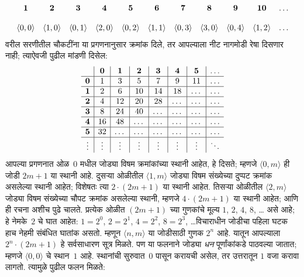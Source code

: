 \documentclass[11pt,a4paper,openany]{book}
\theoremstyle{definition}
\newenvironment{explain}{}{}
\newcommand{\tuple}[1]{\langle #1\rangle}
\begin{document}
\begin{explain}
\[
\begin{array}{@{}cc c c c c c c c c c@{}}
\mathbf 1 & \mathbf 2 & \mathbf 3 & \mathbf 4 & \mathbf 5 & \mathbf 6 & \mathbf 7 & \mathbf 8 & \mathbf 9 & \mathbf{10} & \dots \\ \\
\tuple{0,0} & \tuple{1,0} & \tuple{0,1} & \tuple{2,0}  & \tuple{0,2} &
\tuple{1,1} & \tuple{0,3} & \tuple{3,0}  & \tuple{0,4} &  \tuple{1,2} & \dots \\
\end{array}
\]
वरील सरणीतील चौकटींना या प्रगणनानुसार क्रमांक दिले, तर आपल्याला
नीट नागमोडी रेषा दिसणार नाही; त्याऐवजी पुढील मांडणी दिसेल:
\[
\begin{array}{ c | c | c | c | c | c | c | c }
& \mathbf 0 & \mathbf 1 & \mathbf 2 & \mathbf 3 & \mathbf 4 & \mathbf 5 & \dots \\
\hline
\mathbf 0 & 1 & 3 & 5 & 7 & 9 & 11 & \dots \\
\hline
\mathbf 1 & 2 & 6 & 10 & 14 & 18 & \dots & \dots \\
\hline
\mathbf 2 & 4 & 12 & 20 & 28 & \dots & \dots & \dots \\
\hline
\mathbf 3 & 8 & 24 & 40 & \dots & \dots & \dots & \dots \\
\hline
\mathbf 4 & 16 & 48 & \dots & \dots & \dots & \dots & \dots \\
\hline
\mathbf 5 & 32 & \dots & \dots & \dots & \dots & \dots & \dots \\
\hline
\vdots & \vdots & \vdots & \vdots & \vdots & \vdots & \vdots & \ddots\\
\end{array}
\]
आपल्या प्रगणनात ओळ~$0$ मधील जोड्या विषम क्रमांकांच्या स्थानी आहेत,
हे दिसते; म्हणजे $\tuple{0,m}$ ही जोडी $2m+1$ या स्थानी आहे. दुसऱ्या
ओळीतील $\tuple{1,m}$ जोड्या विषम संख्येच्या दुप्पट क्रमांक असलेल्या
स्थानी आहेत; विशेषतः त्या $2 \cdot (2m+1)$ या स्थानी आहेत. तिसऱ्या
ओळीतील $\tuple{2,m}$ जोड्या विषम संख्येच्या चौपट क्रमांक असलेल्या
स्थानी, म्हणजे $4 \cdot (2m+1)$ या स्थानी आहेत; आणि ही रचना अशीच
पुढे चालते. प्रत्येक ओळीत $(2m+1)$ च्या गुणकांचे मूल्य $1$, $2$,
$4$, $8$, \dots{} असे आहे; हे नेमके~$2$ चे घात आहेत:
$1= 2^0$, $2 = 2^1$, $4 = 2^2$, $8 = 2^3$, \dots\@ विचाराधीन
जोडीचा पहिला घटक हाच नेहमी संबंधित घातांक असतो. म्हणून
$\tuple{n,m}$ या जोडीसाठी गुणक $2^n$ आहे. यातून आपल्याला
$2^n \cdot (2m+1)$ हे सर्वसाधारण सूत्र मिळते. पण या फलनाने जोड्या
\emph{धन} पूर्णांकांकडे पाठवल्या जातात; म्हणजे $\tuple{0,0}$ चे
स्थान~$1$ आहे. स्थानांची सुरुवात~$0$ पासून करायची असेल, तर उत्तरातून
$1$ वजा करावा लागतो. त्यामुळे पुढील फलन मिळते:
\end{explain}
\end{document}
